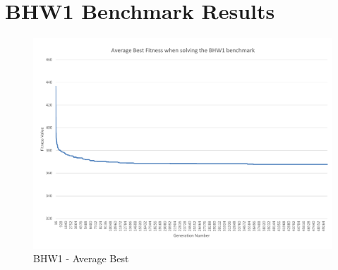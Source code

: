 






\chapter{BHW1 Benchmark Results} %
\label{cha:bhw1_benchmark_results}

\begin{landscape}
\begin{figure}[thbp]
	\centerline{\includegraphics[height=0.945\textwidth]{figures/BHW1_graphs/BHW1_average_best.pdf}}
	\caption{BHW1 - Average Best}
	\label{fig:bhw1ab}
\end{figure}
\end{landscape}

